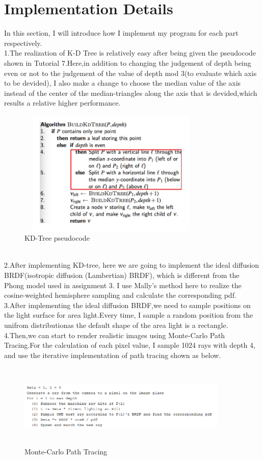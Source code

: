 \documentclass[acmtog]{acmart}
\begin{document}
\section{Implementation Details}
\qquad In this section, I will introduce how I implement my program for each part respectively.
\\\indent 1.The realization of K-D Tree is relatively easy after being given the pseudocode shown in Tutorial 7.Here,in addition to changing the judgement of depth being even or not to the judgement of the value of depth mod 3(to evaluate which axis to be devided), I also make a change to choose the median value of the axis instead of the center of the median-triangles along the axis that is devided,which results a relative higher performance.
\begin{figure}[h]
	\centering
	\includegraphics[width=9cm,height=6cm]{KDTREE.PNG}
	\caption{KD-Tree pseudocode}
\end{figure}
\\\indent 2.After implementing KD-tree, here we are going to implement the ideal diffusion BRDF(isotropic diffusion (Lambertian) BRDF), which is different 
from the Phong model used in assignment 3. I use Mally's method here to realize the cosine-weighted hemisphere sampling and calculate the corresponding pdf.
\\\indent 3.After implementing the ideal diffusion BRDF,we need to sample positions on the light surface for area light.Every time, I sample a random position from the unifrom distributionas the default shape of the area light is a rectangle.
\\\indent 4.Then,we can start to render realistic images using Monte-Carlo Path Tracing.For the calculation of each pixel value, I sample 1024 rays with depth 4, and use the iterative implementation of path tracing shown as below.
\begin{figure}[h]
	\centering
	\includegraphics[width=10cm,height=4cm]{Monte-Carlo Path Tracing.PNG}
	\caption{Monte-Carlo Path Tracing}
\end{figure}
\end{document}
